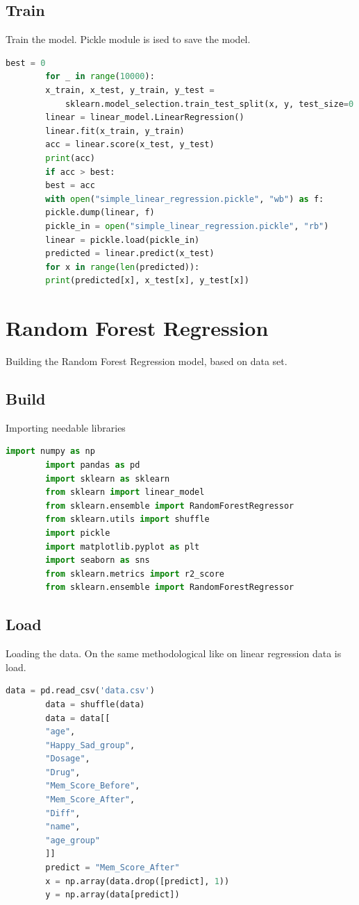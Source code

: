 \documentclass{article}
\begin{document}
    \subsection{Train}
    Train the model.
    Pickle module is ised to save the model.
    \begin{lstlisting}[language=Python]
        best = 0
        for _ in range(10000):
        x_train, x_test, y_train, y_test =
            sklearn.model_selection.train_test_split(x, y, test_size=0.1)
        linear = linear_model.LinearRegression()
        linear.fit(x_train, y_train)
        acc = linear.score(x_test, y_test)
        print(acc)
        if acc > best:
        best = acc
        with open("simple_linear_regression.pickle", "wb") as f:
        pickle.dump(linear, f)
        pickle_in = open("simple_linear_regression.pickle", "rb")
        linear = pickle.load(pickle_in)
        predicted = linear.predict(x_test)
        for x in range(len(predicted)):
        print(predicted[x], x_test[x], y_test[x])
    \end{lstlisting}
    \newpage



    \section{Random Forest Regression}
    Building the Random Forest Regression model, based on data set.
    \subsection{Build} Importing needable libraries
    \begin{lstlisting}[language=Python]
        import numpy as np
        import pandas as pd
        import sklearn as sklearn
        from sklearn import linear_model
        from sklearn.ensemble import RandomForestRegressor
        from sklearn.utils import shuffle
        import pickle
        import matplotlib.pyplot as plt
        import seaborn as sns
        from sklearn.metrics import r2_score
        from sklearn.ensemble import RandomForestRegressor
    \end{lstlisting}
    \subsection{Load}
    Loading the data. On the same methodological like on linear regression data is load.
    \begin{lstlisting}[language=Python]
        data = pd.read_csv('data.csv')
        data = shuffle(data)
        data = data[[
        "age",
        "Happy_Sad_group",
        "Dosage",
        "Drug",
        "Mem_Score_Before",
        "Mem_Score_After",
        "Diff",
        "name",
        "age_group"
        ]]
        predict = "Mem_Score_After"
        x = np.array(data.drop([predict], 1))
        y = np.array(data[predict])
    \end{lstlisting}
    \newpage
\end{document}
